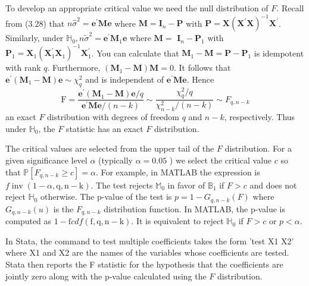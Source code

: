 \documentclass[10pt]{article}
\begin{document}
To develop an appropriate critical value we need the null distribution of $F$. Recall from (3.28) that $n \widehat{\sigma}^{2}=\boldsymbol{e}^{\prime} \boldsymbol{M} \boldsymbol{e}$ where $\boldsymbol{M}=\boldsymbol{I}_{n}-\boldsymbol{P}$ with $\boldsymbol{P}=\boldsymbol{X}\left(\boldsymbol{X}^{\prime} \boldsymbol{X}\right)^{-1} \boldsymbol{X}^{\prime}$. Similarly, under $\mathbb{H}_{0}, n \widetilde{\sigma}^{2}=\boldsymbol{e}^{\prime} \boldsymbol{M}_{1} \boldsymbol{e}$ where $\boldsymbol{M}=$ $\boldsymbol{I}_{n}-\boldsymbol{P}_{1}$ with $\boldsymbol{P}_{1}=\boldsymbol{X}_{1}\left(\boldsymbol{X}_{1}^{\prime} \boldsymbol{X}_{1}\right)^{-1} \boldsymbol{X}_{1}^{\prime}$. You can calculate that $\boldsymbol{M}_{1}-\boldsymbol{M}=\boldsymbol{P}-\boldsymbol{P}_{1}$ is idempotent with rank $q$. Furthermore, $\left(\boldsymbol{M}_{1}-\boldsymbol{M}\right) \boldsymbol{M}=0$. It follows that $\boldsymbol{e}^{\prime}\left(\boldsymbol{M}_{1}-\boldsymbol{M}\right) \boldsymbol{e} \sim \chi_{q}^{2}$ and is independent of $\boldsymbol{e}^{\prime} \boldsymbol{M} \boldsymbol{e}$. Hence
$$
\mathrm{F}=\frac{\boldsymbol{e}^{\prime}\left(\boldsymbol{M}_{1}-\boldsymbol{M}\right) \boldsymbol{e} / q}{\boldsymbol{e}^{\prime} \boldsymbol{M} \boldsymbol{e} /(n-k)} \sim \frac{\chi_{q}^{2} / q}{\chi_{n-k}^{2} /(n-k)} \sim F_{q, n-k}
$$
an exact $F$ distribution with degrees of freedom $q$ and $n-k$, respectively. Thus under $\mathbb{H}_{0}$, the $F$ statistic has an exact $F$ distribution.

The critical values are selected from the upper tail of the $F$ distribution. For a given significance level $\alpha$ (typically $\alpha=0.05$ ) we select the critical value $c$ so that $\mathbb{P}\left[F_{q, n-k} \geq c\right]=\alpha$. For example, in MATLAB the expression is $f \operatorname{inv}(1-\alpha, \mathrm{q}, \mathrm{n}-\mathrm{k})$. The test rejects $\mathbb{M}_{0}$ in favor of $\mathbb{B}_{1}$ if $F>c$ and does not reject $\mathbb{H}_{0}$ otherwise. The p-value of the test is $p=1-G_{q, n-k}(F)$ where $G_{q, n-k}(u)$ is the $F_{q, n-k}$ distribution function. In MATLAB, the p-value is computed as $1-\mathrm{f} c d f(\mathrm{f}, \mathrm{q}, \mathrm{n}-\mathrm{k})$. It is equivalent to reject $\mathbb{H}_{0}$ if $F>c$ or $p<\alpha$.

In Stata, the command to test multiple coefficients takes the form 'test X1 X2' where X1 and X2 are the names of the variables whose coefficients are tested. Stata then reports the F statistic for the hypothesis that the coefficients are jointly zero along with the p-value calculated using the $F$ distribution.
\end{document}
